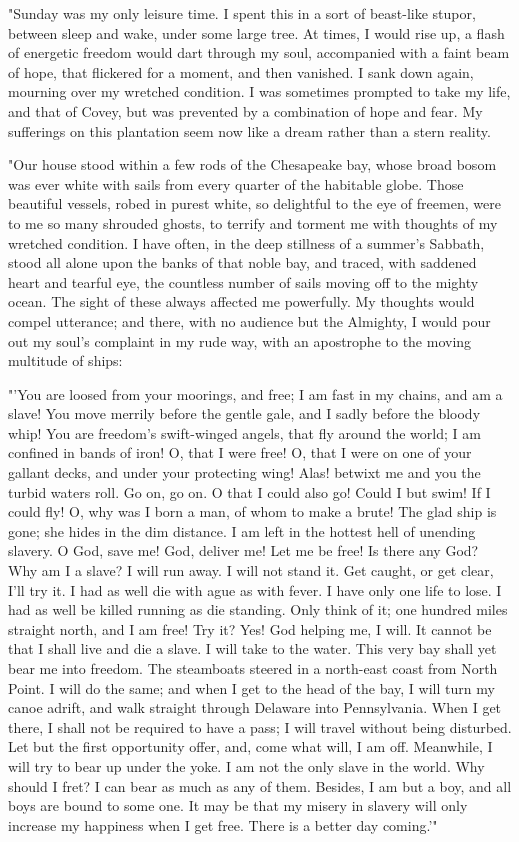 "Sunday was my only leisure time. I spent this in a sort of beast-like
stupor, between sleep and wake, under some large tree. At times, I would
rise up, a flash of energetic freedom would dart through my soul,
accompanied with a faint beam of hope, that flickered for a moment, and
then vanished. I sank down again, mourning over my wretched condition. I
was sometimes prompted to take my life, and that of Covey, but was
prevented by a combination of hope and fear. My sufferings on this
plantation seem now like a dream rather than a stern reality.

{\protect\hypertarget{220}{}{}}"Our house stood within a few rods of the
Chesapeake bay, whose broad bosom was ever white with sails from every
quarter of the habitable globe. Those beautiful vessels, robed in purest
white, so delightful to the eye of freemen, were to me so many shrouded
ghosts, to terrify and torment me with thoughts of my wretched
condition. I have often, in the deep stillness of a summer's Sabbath,
stood all alone upon the banks of that noble bay, and traced, with
saddened heart and tearful eye, the countless number of sails moving off
to the mighty ocean. The sight of these always affected me powerfully.
My thoughts would compel utterance; and there, with no audience but the
Almighty, I would pour out my soul's complaint in my rude way, with an
apostrophe to the moving multitude of ships:

{"}'You are loosed from your moorings, and free; I am fast in my chains,
and am a slave! You move merrily before the gentle gale, and I sadly
before the bloody whip! You are freedom's swift-winged angels, that fly
around the world; I am confined in bands of iron! O, that I were free!
O, that I were on one of your gallant decks, and under your protecting
wing! Alas! betwixt me and you the turbid waters roll. Go on, go on. O
that I could also go! Could I but swim! If I could fly! O, why was I
born a man, of whom to make a brute! The glad ship is gone; she hides in
the dim distance. I am left in the hottest hell of unending slavery. O
God, save me! God, deliver me! Let me be free! Is there any God? Why am
I a slave? I will run away. I will not stand it. Get caught, or get
clear, I'll try it. I had as well die with ague as with fever. I have
only one life to lose. I had as well be killed running as die standing.
Only think of it; one hundred miles straight north, and I am free! Try
it? Yes! God helping me, I will. It cannot be that I shall live and die
a slave. I will take to the water. This very bay shall yet bear me into
freedom. The steamboats steered in a north-east coast from North
{\protect\hypertarget{221}{}{}}Point. I will do the same; and when I get
to the head of the bay, I will turn my canoe adrift, and walk straight
through Delaware into Pennsylvania. When I get there, I shall not be
required to have a pass; I will travel without being disturbed. Let but
the first opportunity offer, and, come what will, I am off. Meanwhile, I
will try to bear up under the yoke. I am not the only slave in the
world. Why should I fret? I can bear as much as any of them. Besides, I
am but a boy, and all boys are bound to some one. It may be that my
misery in slavery will only increase my happiness when I get free. There
is a better day coming.{'}"

